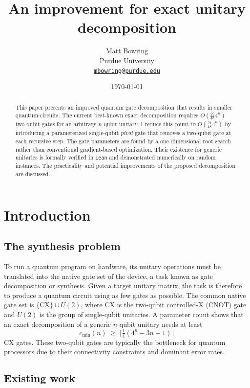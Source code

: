 \documentclass[11pt]{article}
\title{An improvement for exact unitary decomposition}
\author{Matt Bowring\\[2pt]
{\normalsize Purdue University}\\[2pt]
{\normalsize\href{mailto:mbowring@purdue.edu}{\texttt{mbowring@purdue.edu}}}}
\date{\today}
\begin{document}
\maketitle

\begin{abstract}
This paper presents an improved quantum gate decomposition that results in smaller quantum circuits.
The current best-known exact decomposition requires $O(\frac{22}{48} 4^n)$ two-qubit gates for an arbitrary $n$-qubit unitary. I reduce this count to $O(\frac{21}{48} 4^n)$ by introducing a parameterized single-qubit \emph{pivot} gate that removes a two-qubit gate at each recursive step. The gate parameters are found by a one-dimensional root search rather than conventional gradient-based optimization. Their existence for generic unitaries is formally verified in \texttt{Lean} and demonstrated numerically on random instances. The practicality and potential improvements of the proposed decomposition are discussed.
\end{abstract}

\section{Introduction}

\subsection{The synthesis problem}

To run a quantum program on hardware, its unitary operations must be translated into the native gate set of the device, a task known as gate decomposition or synthesis. Given a target unitary matrix, the task is therefore to produce a quantum circuit using as few gates as possible. The common native gate set is $\{\mathrm{CX}\}\cup U(2)$, where CX is the two-qubit controlled-X (CNOT) gate and $U(2)$ is the group of single-qubit unitaries. A parameter count shows that an exact decomposition of a generic $n$-qubit unitary needs at least~\cite{smb2q}
\[
c_{\min}(n)\ \ge\ \big\lceil \tfrac14(4^n-3n-1)\big\rceil
\]
CX gates. These two-qubit gates are typically the bottleneck for quantum processors due to their connectivity constraints and dominant error rates.

\subsection{Existing work}
\end{document}
